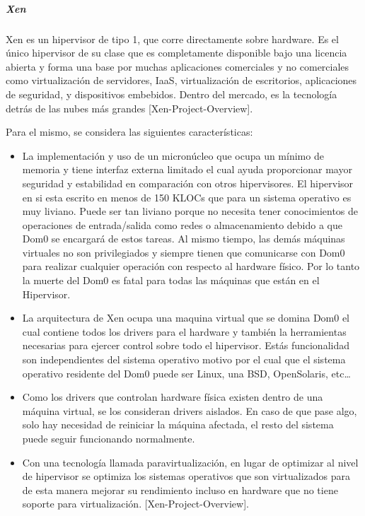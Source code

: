 \subparagraph{Xen}
Xen es un hipervisor de tipo 1, que corre directamente sobre hardware. Es el único hipervisor de su clase que es completamente disponible bajo una licencia abierta y forma una base por muchas aplicaciones comerciales y no comerciales como virtualización de servidores, IaaS, virtualización de escritorios, aplicaciones de seguridad, y dispositivos embebidos. Dentro del mercado, es la tecnología detrás de las nubes más grandes [Xen-Project-Overview].
 
Para el mismo, se considera las siguientes características:
\begin{itemize}
	\item La implementación y uso de un micronúcleo que ocupa un mínimo de memoria y tiene interfaz externa limitado el cual ayuda proporcionar mayor seguridad y estabilidad en comparación con otros hipervisores. El hipervisor en si esta escrito en menos de 150 KLOCs que para un sistema operativo es muy liviano. Puede ser tan liviano porque no necesita tener conocimientos de operaciones de entrada/salida como redes o almacenamiento debido a que Dom0 se encargará de estos tareas. Al mismo tiempo, las demás máquinas virtuales no son privilegiados y siempre tienen que comunicarse con Dom0 para realizar cualquier operación con respecto al hardware físico. Por lo tanto la muerte del Dom0 es fatal para todas las máquinas que están en el Hipervisor.
    \item La arquitectura de Xen ocupa una maquina virtual que se domina Dom0 el cual contiene todos los drivers para el hardware y también la herramientas necesarias para ejercer control sobre todo el hipervisor. Estás funcionalidad son independientes del sistema operativo motivo por el cual que el sistema operativo residente del Dom0 puede ser Linux, una BSD, OpenSolaris, etc\ldots
    \item Como los drivers que controlan hardware física existen dentro de una máquina virtual, se los consideran drivers aislados. En caso de que pase algo, solo hay necesidad de reiniciar la máquina afectada, el resto del sistema puede seguir funcionando normalmente.
    \item Con una tecnología llamada paravirtualización, en lugar de optimizar al nivel de hipervisor se optimiza los sistemas operativos que son virtualizados para de esta manera mejorar su rendimiento incluso en hardware que no tiene soporte para virtualización. [Xen-Project-Overview].
\end{itemize}

